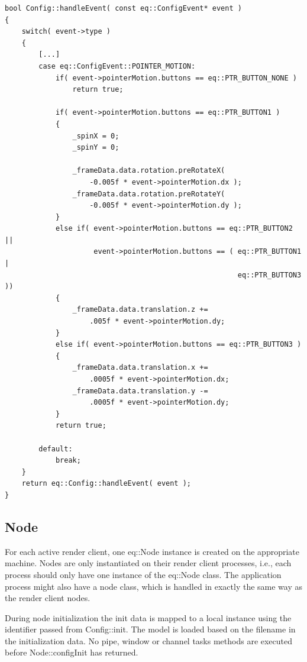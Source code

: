 \documentclass[10pt,a4]{scrartcl}
\begin{document}
{\footnotesize\begin{lstlisting}
bool Config::handleEvent( const eq::ConfigEvent* event )
{
    switch( event->type )
    {
        [...]
        case eq::ConfigEvent::POINTER_MOTION:
            if( event->pointerMotion.buttons == eq::PTR_BUTTON_NONE )
                return true;

            if( event->pointerMotion.buttons == eq::PTR_BUTTON1 )
            {
                _spinX = 0;
                _spinY = 0;

                _frameData.data.rotation.preRotateX( 
                    -0.005f * event->pointerMotion.dx );
                _frameData.data.rotation.preRotateY(
                    -0.005f * event->pointerMotion.dy );
            }
            else if( event->pointerMotion.buttons == eq::PTR_BUTTON2 ||
                     event->pointerMotion.buttons == ( eq::PTR_BUTTON1 |
                                                       eq::PTR_BUTTON3 ))
            {
                _frameData.data.translation.z +=
                    .005f * event->pointerMotion.dy;
            }
            else if( event->pointerMotion.buttons == eq::PTR_BUTTON3 )
            {
                _frameData.data.translation.x += 
                    .0005f * event->pointerMotion.dx;
                _frameData.data.translation.y -= 
                    .0005f * event->pointerMotion.dy;
            }
            return true;

        default:
            break;
    }
    return eq::Config::handleEvent( event );
}
\end{lstlisting}}


\subsection{Node}

For each active render client, one \textsf{eq::Node} instance is
created on the appropriate machine. Nodes are only instantiated on their
render client processes, i.e., each process should only have one
instance of the \textsf{eq::Node} class. The application process might
also have a node class, which is handled in exactly the same way as the
render client nodes.

During node initialization the init data is mapped to a local instance
using the identifier passed from \textsf{Config::init}. The model is
loaded based on the filename in the initialization data. No pipe, window
or channel tasks methods are executed before \textsf{Node::configInit}
has returned.
\end{document}
